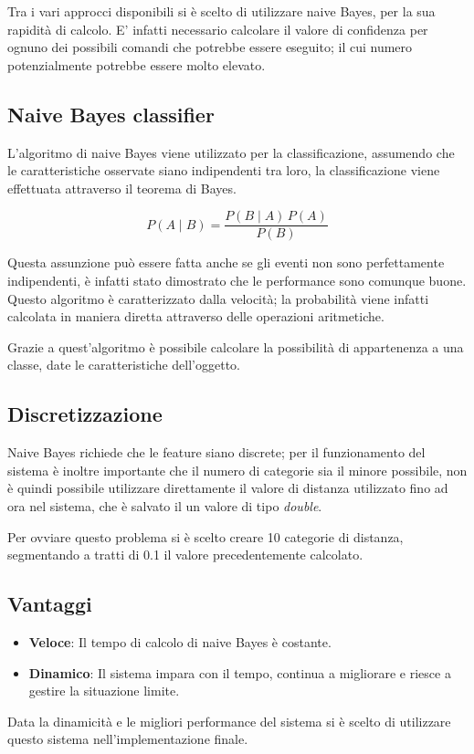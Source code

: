 \documentclass[twoside]{supsistudent}
\begin{document}
Tra i vari approcci disponibili si è scelto di utilizzare naive Bayes, per la sua rapidità di calcolo. E' infatti necessario calcolare il valore di confidenza per ognuno dei possibili comandi che potrebbe essere eseguito; il cui numero potenzialmente potrebbe essere molto elevato.
\subsection{Naive Bayes classifier}
L'algoritmo di naive Bayes viene utilizzato per la classificazione, assumendo che le caratteristiche osservate siano indipendenti tra loro, la classificazione viene effettuata attraverso il teorema di Bayes.

$$ P(A \mid B) = \frac{P(B \mid A) \, P(A)}{P(B)} $$

Questa assunzione può essere fatta anche se gli eventi non sono perfettamente indipendenti, è infatti stato dimostrato che le performance sono comunque buone. Questo algoritmo è caratterizzato dalla velocità; la probabilità viene infatti calcolata in maniera diretta attraverso delle operazioni aritmetiche.

Grazie a quest'algoritmo è possibile calcolare la possibilità di appartenenza a una classe, date le caratteristiche dell'oggetto.

\subsection{Discretizzazione}
Naive Bayes richiede che le feature siano discrete; per il funzionamento del sistema è inoltre importante che il numero di categorie sia il minore possibile, non è quindi possibile utilizzare direttamente il valore di distanza utilizzato fino ad ora nel sistema, che è salvato il un valore di tipo \textit{double}.

Per ovviare questo problema si è scelto creare 10 categorie di distanza, segmentando a tratti di 0.1 il valore precedentemente calcolato.
\subsection{Vantaggi}
\begin{itemize}
  \item \textbf{Veloce}: Il tempo di calcolo di naive Bayes è costante.
  \item \textbf{Dinamico}: Il sistema impara con il tempo, continua a migliorare e riesce a gestire la situazione limite.
\end{itemize}
Data la dinamicità e le migliori performance del sistema si è scelto di utilizzare questo sistema nell'implementazione finale.
\end{document}
